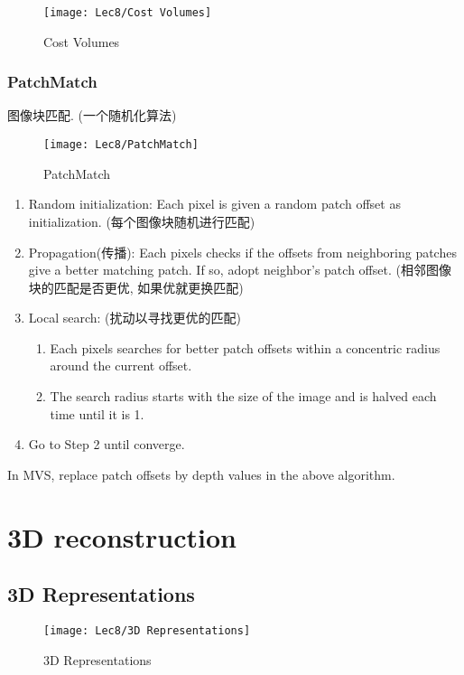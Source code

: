 \begin{figure}[H]
    \centering
    \texttt{[image: Lec8/Cost Volumes]}
    \caption{Cost Volumes}
\end{figure}

\subsubsection{PatchMatch}
图像块匹配. (一个随机化算法)

\begin{figure}[H]
    \centering
    \texttt{[image: Lec8/PatchMatch]}
    \caption{PatchMatch}
\end{figure}

\begin{enumerate}
    \item Random initialization: Each pixel is given a random patch offset as initialization. (每个图像块随机进行匹配)
    \item Propagation(传播): Each pixels checks if the offsets from neighboring patches give a better matching patch. If so, adopt neighbor's patch offset. (相邻图像块的匹配是否更优, 如果优就更换匹配)
    \item Local search: (扰动以寻找更优的匹配)
    \begin{enumerate}
        \item Each pixels searches for better patch offsets within a concentric radius around the current offset.
        \item The search radius starts with the size of the image and is halved each time until it is 1.
    \end{enumerate}
    \item Go to Step 2 until converge.
\end{enumerate}

In MVS, replace patch offsets by depth values in the above algorithm. 

\section{3D reconstruction}

\subsection{3D Representations}

\begin{figure}[H]
    \centering
    \texttt{[image: Lec8/3D Representations]}
    \caption{3D Representations}
\end{figure}

